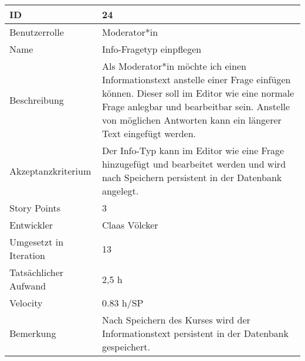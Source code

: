 \begin{tabularx}{\textwidth}{|p{}|X|}
	\hline
	ID & 24 \\
	\hline
	Benutzerrolle & Moderator*in \\
	\hline
	Name & Info-Fragetyp einpflegen\\
	\hline
	Beschreibung & Als Moderator*in möchte ich einen Informationstext anstelle einer Frage einfügen können.
		Dieser soll im Editor wie eine normale Frage anlegbar und bearbeitbar sein.
		Anstelle von möglichen Antworten kann ein längerer Text eingefügt werden.\\
	\hline
	Akzeptanzkriterium & Der Info-Typ kann im Editor wie eine Frage hinzugefügt und bearbeitet werden und wird nach Speichern persistent in der Datenbank angelegt. \\
	\hline
	Story Points & 3 \\
	\hline
	Entwickler & Claas Völcker\\
	\hline
	Umgesetzt in Iteration & 13\\
	\hline
	Tatsächlicher Aufwand & 2,5 h\\
	\hline
	Velocity & 0.83 h/SP\\
	\hline
	Bemerkung & Nach Speichern des Kurses wird der Informationstext persistent in der Datenbank gespeichert.\\
	\hline
\end{tabularx}
\vspace{20pt}
